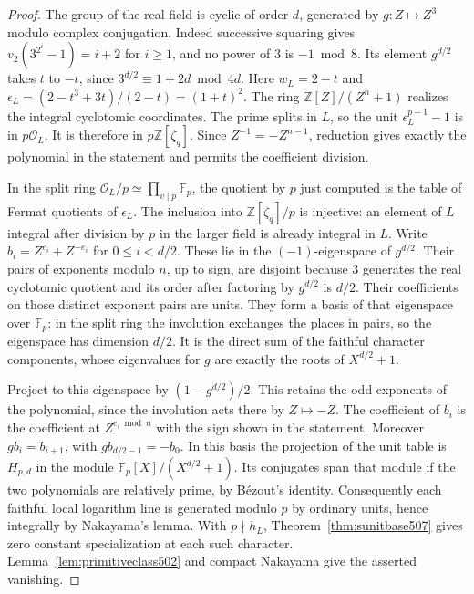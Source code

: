\documentclass[a4paper,11pt]{article}
\theoremstyle{definition}
\theoremstyle{remark}
\newcommand{\ZZ}{\mathbb Z}\newcommand{\ord}{\operatorname{ord}}
\numberwithin{equation}{section}
\begin{document}
\begin{proof}
The group of the real field is cyclic of order \(d\), generated by
\(g:Z\mapsto Z^3\) modulo complex conjugation. Indeed successive
squaring gives \(v_2(3^{2^i}-1)=i+2\) for \(i\ge1\), and no power
of \(3\) is \(-1\bmod8\). Its element \(g^{d/2}\) takes \(t\) to
\(-t\), since \(3^{d/2}\equiv1+2d\bmod4d\). Here
\(w_L=2-t\) and \(\epsilon_L=(2-t^3+3t)/(2-t)=(1+t)^2\).
The ring \(\ZZ[Z]/(Z^n+1)\) realizes the integral cyclotomic
coordinates. The prime splits in \(L\), so the unit
\(\epsilon_L^{p-1}-1\) is in \(p\mathcal O_L\). It is therefore in
\(p\ZZ[\zeta_q]\). Since \(Z^{-1}=-Z^{n-1}\), reduction gives exactly
the polynomial in the statement and permits the coefficient division.

In the split ring \(\mathcal O_L/p\simeq\prod_{v\mid p}\mathbb F_p\),
the quotient by \(p\) just computed is the table of Fermat quotients
of \(\epsilon_L\). The inclusion into \(\ZZ[\zeta_q]/p\) is injective:
an element of \(L\) integral after division by \(p\) in the larger
field is already integral in \(L\). Write
\(b_i=Z^{e_i}+Z^{-e_i}\) for \(0\le i<d/2\). These lie in the
\((-1)\)-eigenspace of \(g^{d/2}\). Their pairs of exponents modulo
\(n\), up to sign, are disjoint because \(3\) generates the real
cyclotomic quotient and its order after factoring by \(g^{d/2}\)
is \(d/2\). Their coefficients on those distinct exponent pairs are
units. They form a basis of that eigenspace over \(\mathbb F_p\):
in the split ring the involution exchanges the places in pairs, so
the eigenspace has dimension \(d/2\). It is the direct sum of the
faithful character components, whose eigenvalues for \(g\) are
exactly the roots of \(X^{d/2}+1\).

Project to this eigenspace by \((1-g^{d/2})/2\). This retains the
odd exponents of the polynomial, since the involution acts there by
\(Z\mapsto-Z\). The coefficient of \(b_i\) is the coefficient at
\(Z^{e_i\bmod n}\) with the sign shown in the statement. Moreover
\(g b_i=b_{i+1}\), with \(g b_{d/2-1}=-b_0\). In this basis the
projection of the unit table is \(H_{p,d}\) in the module
\(\mathbb F_p[X]/(X^{d/2}+1)\). Its conjugates span that module if
the two polynomials are relatively prime, by B\'ezout's identity.
Consequently each faithful local logarithm line is generated modulo
\(p\) by ordinary units, hence integrally by Nakayama's lemma. With
\(p\nmid h_L\), Theorem~\ref{thm:sunitbase507} gives zero constant
specialization at each such character. Lemma~\ref{lem:primitiveclass502}
and compact Nakayama give the asserted vanishing.
\end{proof}
\end{document}
